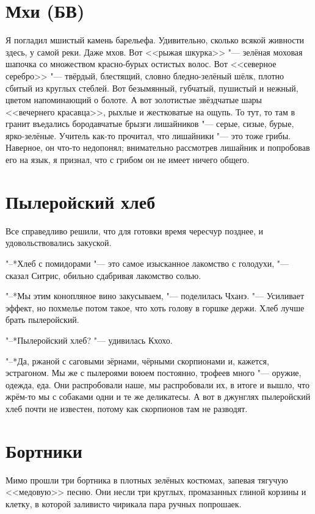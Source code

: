 \section{Мхи (БВ)}

Я погладил мшистый камень барельефа.
Удивительно, сколько всякой живности здесь, у самой реки.
Даже мхов.
Вот <<рыжая шкурка>> "--- зелёная моховая шапочка со множеством красно-бурых остистых волос.
Вот <<северное серебро>> "--- твёрдый, блестящий, словно бледно-зелёный шёлк, плотно сбитый из круглых стеблей.
Вот безымянный, губчатый, пушистый и нежный, цветом напоминающий о болоте.
А вот золотистые звёздчатые шары <<вечернего красавца>>, рыхлые и жестковатые на ощупь.
То тут, то там в гранит въедались бородавчатые брызги лишайников "--- серые, сизые, бурые, ярко-зелёные.
Учитель как-то прочитал, что лишайники "--- это тоже грибы.
Наверное, он что-то недопонял;
внимательно рассмотрев лишайник и попробовав его на язык, я признал, что с грибом он не имеет ничего общего.

\section{Пылеройский хлеб}

Все справедливо решили, что для готовки время чересчур позднее, и удовольствовались закуской.

"--*Хлеб с помидорами "--- это самое изысканное лакомство с голодухи, "--- сказал Ситрис, обильно сдабривая лакомство солью.

"--*Мы этим конопляное вино закусываем, "--- поделилась Чханэ.
"--- Усиливает эффект, но похмелье потом такое, что хоть голову в горшке держи.
Хлеб лучше брать пылеройский.

"--*Пылеройский хлеб? "--- удивилась Кхохо.

"--*Да, ржаной с саговыми зёрнами, чёрными скорпионами и, кажется, эстрагоном.
Мы же с пылероями воюем постоянно, трофеев много "--- оружие, одежда, еда.
Они распробовали наше, мы распробовали их, в итоге и вышло, что жрём-то мы с собаками одни и те же деликатесы.
А вот в джунглях пылеройский хлеб почти не известен, потому как скорпионов там не разводят.

\section{Бортники}

Мимо прошли три бортника в плотных зелёных костюмах, запевая тягучую <<медовую>> песню.
Они несли три круглых, промазанных глиной корзины и клетку, в которой заливисто чирикала пара ручных попрошаек.

